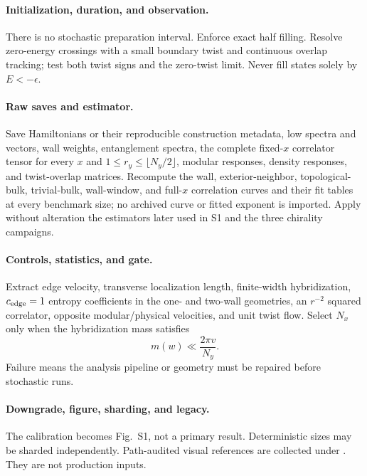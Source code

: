 \documentclass[aps,prx,twocolumn,floatfix,nofootinbib,superscriptaddress,longbibliography]{revtex4-2}
\begin{document}
\paragraph*{Initialization, duration, and observation.}
There is no stochastic preparation interval.  Enforce exact half filling.  Resolve zero-energy crossings
with a small boundary twist and continuous overlap tracking; test both twist signs and the
zero-twist limit.  Never fill states solely by $E<-\epsilon$.

\paragraph*{Raw saves and estimator.}
Save Hamiltonians or their reproducible construction metadata, low spectra and vectors,
wall weights, entanglement spectra, the complete fixed-$x$ correlator tensor for every
$x$ and $1\leq r_y\leq\lfloor N_y/2\rfloor$, modular responses, density responses, and
twist-overlap matrices.  Recompute the wall, exterior-neighbor, topological-bulk,
trivial-bulk, wall-window, and full-$x$ correlation curves and their fit tables at every
benchmark size; no archived curve or fitted exponent is imported.  Apply without
alteration the estimators later used in S1 and the three chirality campaigns.

\paragraph*{Controls, statistics, and gate.}
Extract edge velocity, transverse localization length, finite-width hybridization,
$c_{\rm edge}=1$ entropy coefficients in the one- and two-wall geometries, an $r^{-2}$ squared
correlator, opposite modular/physical velocities, and unit twist flow.  Select $N_x$ only
when the hybridization mass satisfies
\begin{equation}
 m(w)\ll \frac{2\pi v}{N_y}.
\end{equation}
Failure means the analysis pipeline or geometry must be repaired before stochastic runs.

\paragraph*{Downgrade, figure, sharding, and legacy.}
The calibration becomes Fig.~S1, not a primary result.  Deterministic sizes may be sharded
independently.  Path-audited visual references are collected under
.  They are not production inputs.
\end{document}
